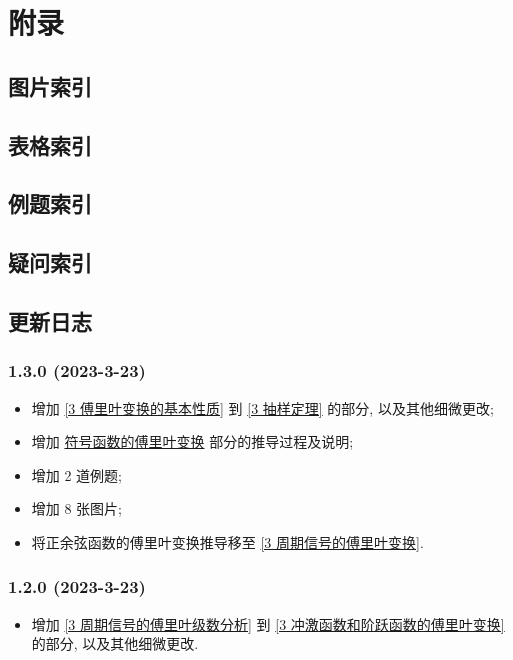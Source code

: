 \section{附录} \label{附录}
\subsection{图片索引} \label{图片索引}
\makeatletter
{}
\makeatother

\subsection{表格索引} \label{表格索引}
\makeatletter
{}
\makeatother

\subsection{例题索引} \label{例题索引}
\listofexampleprobs

\subsection{疑问索引} \label{疑问索引}
\listofquestions

\subsection{更新日志} \label{更新日志}
\subsubsection*{1.3.0 (2023-3-23)}
\begin{itemize}
    \item 增加 \ref{3 傅里叶变换的基本性质} 到 \ref{3 抽样定理} 的部分, 以及其他细微更改;
    \item 增加 \hyperref[proofs 符号函数的傅里叶变换]{符号函数的傅里叶变换} 部分的推导过程及说明;
    \item 增加 2 道例题;
    \item 增加 8 张图片;
    \item 将正余弦函数的傅里叶变换推导移至 \ref{3 周期信号的傅里叶变换}.
\end{itemize}

\subsubsection*{1.2.0 (2023-3-23)}
\begin{itemize}
    \item 增加 \ref{3 周期信号的傅里叶级数分析} 到 \ref{3 冲激函数和阶跃函数的傅里叶变换} 的部分, 以及其他细微更改.
\end{itemize}

